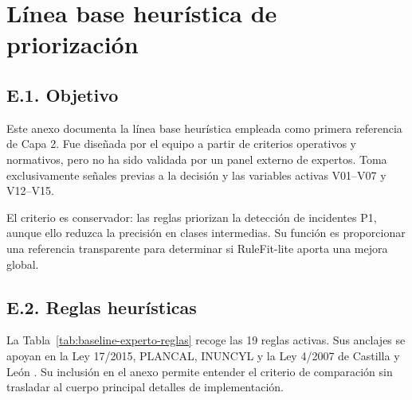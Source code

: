 \chapter{Línea base heurística de priorización}
\label{cap:anexoe}

\section*{E.1. Objetivo}

Este anexo documenta la línea base heurística empleada como primera referencia de
Capa 2. Fue diseñada por el equipo a partir de criterios operativos y normativos,
pero no ha sido validada por un panel externo de expertos. Toma exclusivamente
señales previas a la decisión y las variables activas V01--V07 y V12--V15.

El criterio es conservador: las reglas priorizan la detección de incidentes P1,
aunque ello reduzca la precisión en clases intermedias. Su función es proporcionar
una referencia transparente para determinar si RuleFit-lite aporta una mejora global.

\section*{E.2. Reglas heurísticas}

La Tabla~\ref{tab:baseline-experto-reglas} recoge las 19 reglas activas. Sus anclajes
se apoyan en la Ley 17/2015, PLANCAL, INUNCYL y la Ley 4/2007 de Castilla y León
\cite{Ley17_2015,PLANCAL_DEC_4_2019,INUNCYL,Ley4_2007_CYL}. Su inclusión en el anexo permite entender el criterio de comparación sin trasladar al cuerpo principal detalles de implementación.

